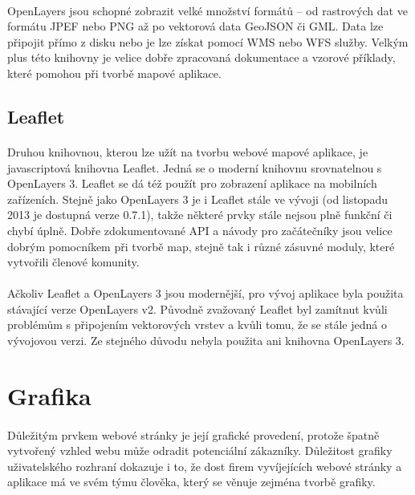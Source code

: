\documentclass[11pt,a4paper,titlepage,oneside]{book}
\begin{document}
			\paragraph{}OpenLayers jsou schopné zobrazit velké množství formátů -- od rastrových dat ve formátu JPEF nebo PNG až po vektorová data GeoJSON či GML. Data lze připojit přímo z disku nebo je lze získat pomocí WMS nebo WFS služby. Velkým plus této knihovny je velice dobře zpracovaná dokumentace a vzorové příklady, které pomohou při tvorbě mapové aplikace. 
		\subsection{Leaflet}
			\paragraph{} Druhou knihovnou, kterou lze užít na tvorbu webové mapové aplikace, je javascriptová knihovna Leaflet. Jedná se o moderní knihovnu srovnatelnou s OpenLayers 3. Leaflet se dá též použít pro zobrazení aplikace na mobilních zařízeních. Stejně jako OpenLayers 3 je i Leaflet stále ve vývoji (od listopadu 2013 je dostupná verze 0.7.1), takže některé prvky stále nejsou plně funkční či chybí úplně. Dobře zdokumentované API a návody pro začátečníky jsou velice dobrým pomocníkem při tvorbě map, stejně tak i různé zásuvné moduly, které vytvořili členové komunity.
		\paragraph{} Ačkoliv Leaflet a OpenLayers 3 jsou modernější, pro vývoj aplikace byla použita stávající verze OpenLayers v2. Původně zvažovaný Leaflet byl zamítnut kvůli problémům s připojením vektorových vrstev a kvůli tomu, že se stále jedná o vývojovou verzi. Ze stejného důvodu nebyla použita ani knihovna OpenLayers 3.


	\section{Grafika}



		\paragraph{} Důležitým prvkem webové stránky je její grafické provedení, protože špatně vytvořený vzhled webu může odradit potenciální zákazníky. Důležitost grafiky uživatelského rozhraní dokazuje i to, že dost firem vyvíjejících webové stránky a aplikace má ve svém týmu člověka, který se věnuje zejména tvorbě grafiky.
\end{document}
